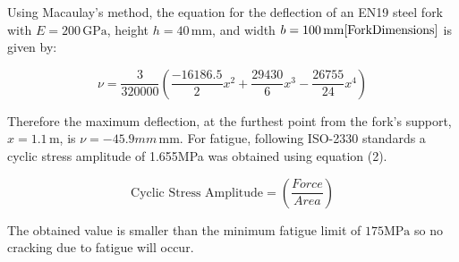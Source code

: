 \documentclass[12pt,titlepage]{article}
\begin{document}
Using Macaulay's method, the equation for the deflection of an EN19 steel fork with \( E = 200 \, \text{GPa} \), height \( h = 40 \, \text{mm} \), and width \( b = 100 \, \text{mm} \cite{ForkDimensions} \) is given by:

\vspace{-17pt}
\begin{equation}
   \nu = \frac{3}{320000} \left( \frac{-16186.5}{2}x^2 + \frac{29430}{6}x^3 - \frac{26755}{24}x^4 \right)
\end{equation}
\vspace{-27pt}

Therefore the maximum deflection, at the furthest point from the fork's support, \(x = 1.1 \, \text{m}\), is \(\nu = -45.9mm \, \text{mm}\).
For fatigue, following ISO-2330 standards a cyclic stress amplitude of 1.655MPa was obtained using equation (2).

\vspace{-20pt}
\begin{equation}
   \text{Cyclic Stress Amplitude} = \left (\frac{Force}{Area} \right)
\end{equation}
\vspace{-30pt}

The obtained value is smaller than the minimum fatigue limit of \(175 \text{MPa}\) so no cracking due to fatigue will occur.
\end{document}
